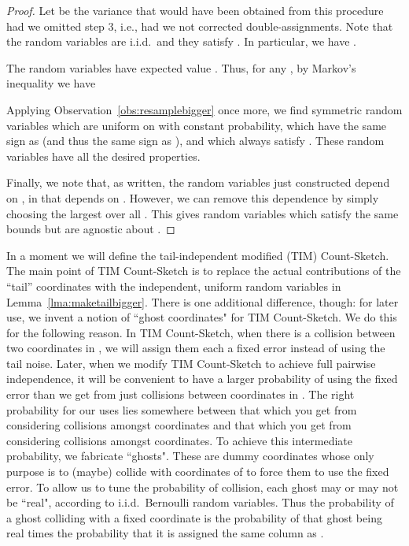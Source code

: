 \documentclass[letterpaper,11pt]{article}
\begin{document}
\begin{proof}
Let  be the variance that would have
been obtained from this procedure had we omitted
step 3, i.e., had we not corrected double-assignments.
Note that the random variables  are
i.i.d.\ and they satisfy .
In particular, we have .

The random variables  have expected value
.
Thus, for any , by Markov's inequality we have

Applying Observation~\ref{obs:resamplebigger} once more, we find
symmetric random variables  which are uniform on 
with constant probability, which have the same sign as  (and thus
the same sign as ), and which always satisfy .  These random variables have all the
desired properties.

Finally, we note that, as written, the random variables just constructed
depend on , in that  depends on .  However, we can remove this
dependence by simply choosing the largest  over all .  This gives
random variables which satisfy the same bounds but are agnostic about .
\end{proof}

In a moment we will define the tail-independent modified (TIM) Count-Sketch.
The main point of TIM Count-Sketch is to replace the actual contributions of the ``tail'' coordinates
 with the independent, uniform random variables in
Lemma~\ref{lma:maketailbigger}.
There is one additional difference, though:
for later use, we invent a notion of ``ghost coordinates" for TIM Count-Sketch.
We do this for the following reason.  In TIM Count-Sketch, when there is a collision
between two coordinates in , we will assign them each a fixed error
instead of using the tail noise.  Later, when we modify TIM Count-Sketch to achieve
full pairwise independence, it will be convenient to have a larger probability of
using the fixed error than we get from just collisions between coordinates in .  
The right probability for our uses lies somewhere between that which you get from
considering collisions amongst  coordinates and that which you get from
considering collisions amongst  coordinates.  To achieve
this intermediate probability, we fabricate  ``ghosts".
These are dummy coordinates whose only purpose is to (maybe) collide with
coordinates of  to force them to use the fixed error.  To allow us to tune
the probability of collision, each ghost may or may not be ``real", according to
i.i.d.\ Bernoulli random variables.  Thus the probability of a ghost colliding
with a fixed coordinate  is the probability of that ghost being real times
the probability that it is assigned the same column as .
\end{document}
